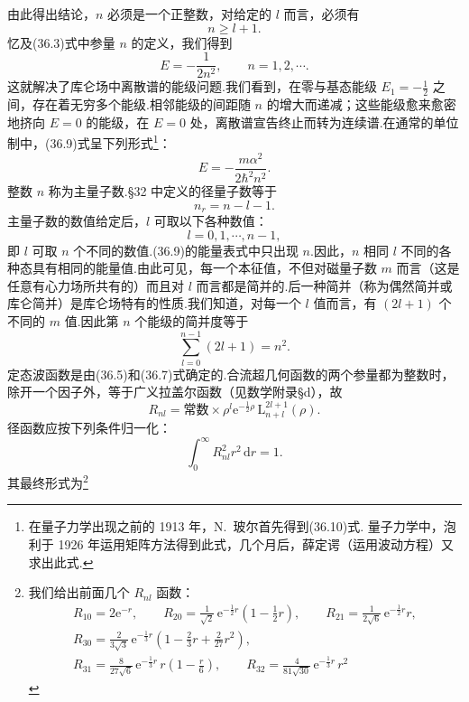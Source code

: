 由此得出结论，$n$ 必须是一个正整数，对给定的 $l$ 而言，必须有
\begin{equation}
  n\geqslant l+1.
\end{equation}
忆及(36.3)式中参量 $n$ 的定义，我们得到
\begin{equation}
  E=-\frac{1}{2n^2},\qquad n=1,2,\cdots.
\end{equation}
这就解决了库仑场中离散谱的能级问题.我们看到，在零与基态能级 $E_1=-\frac{1}{2}$ 之间，存在着无穷多个能级.相邻能级的间距随 $n$ 的增大而递减；这些能级愈来愈密地挤向 $E=0$ 的能级，在 $E=0$ 处，离散谱宣告终止而转为连续谱.在通常的单位制中，(36.9)式呈下列形式\footnote{在量子力学出现之前的 1913 年，N.~玻尔首先得到(36.10)式. 量子力学中，泡利于 1926 年运用矩阵方法得到此式，几个月后，薛定谔（运用波动方程）又求出此式.}：
\begin{equation}
  E=-\frac{m\alpha^2}{2\hbar^2n^2}.
\end{equation}
整数 $n$ 称为主量子数.§32 中定义的径量子数等于
\begin{equation*}
  n_r=n-l-1.
\end{equation*}
主量子数的数值给定后，$l$ 可取以下各种数值：
\begin{equation}
  l=0,1,\cdots,n-1,
\end{equation}
即 $l$ 可取 $n$ 个不同的数值.(36.9)的能量表式中只出现 $n$.因此，$n$ 相同 $l$ 不同的各种态具有相同的能量值.由此可见，每一个本征值，不但对磁量子数 $m$ 而言（这是任意有心力场所共有的）而且对 $l$ 而言都是简并的.后一种简并（称为偶然简并或库仑简并）是库仑场特有的性质.我们知道，对每一个 $l$ 值而言，有 $(2l+1)$ 个不同的 $m$ 值.因此第 $n$ 个能级的简并度等于
\begin{equation}
  \sum_{l=0}^{n-1}(2l+1)=n^2.
\end{equation}
定态波函数是由(36.5)和(36.7)式确定的.合流超几何函数的两个参量都为整数时，除开一个因子外，等于广义拉盖尔函数（见数学附录§d），故
\begin{equation*}
  R_{nl}=\text{常数}\times\rho^l\mathrm{e}^{-\frac{1}{2}\rho}\,
  \mathrm{L}_{n+l}^{2l+1}(\rho).
\end{equation*}
径函数应按下列条件归一化：
\begin{equation*}
  \int_0^{\infty}R_{nl}^2r^2\,\mathrm{d}r=1.
\end{equation*}
其最终形式为\footnote{我们给出前面几个 $R_{nl}$ 函数：
\begin{equation*}
\begin{gathered}
  R_{10}=2\mathrm{e}^{-r},\qquad
  R_{20}=\frac{1}{\sqrt{2}}\,\mathrm{e}^{-\frac{1}{2}r}
  \left(1-\frac{1}{2}r\right),\qquad
  R_{21}=\frac{1}{2\sqrt{6}}\,\mathrm{e}^{-\frac{1}{2}r}r,\\
  R_{30}=\frac{2}{3\sqrt{3}}\,\mathrm{e}^{-\frac{1}{3}r}
  \left(1-\frac{2}{3}r+\frac{2}{27}r^2\right),\\
  R_{31}=\frac{8}{27\sqrt{6}}\,\mathrm{e}^{-\frac{1}{3}r}\,
  r\left(1-\frac{r}{6}\right),\qquad
  R_{32}=\frac{4}{81\sqrt{30}}\,\mathrm{e}^{-\frac{1}{3}r}\,r^2
\end{gathered}
\end{equation*}}
